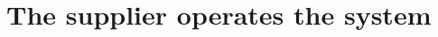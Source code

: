 \documentclass[Main]{subfiles}
\begin{document}
\section{The supplier operates the system}
\end{document}
